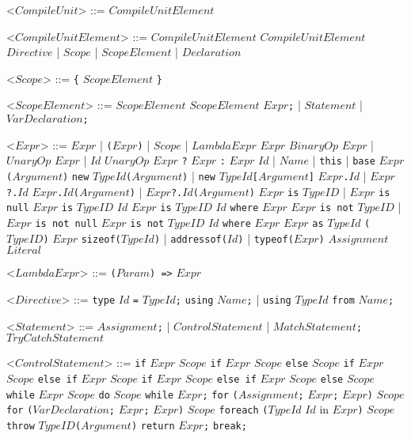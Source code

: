 \documentclass{article}
\newcommand{\gtext}[1]{<$#1$>}
\newcommand{\glit}[1]{\texttt{#1}}
\begin{document}
\begin{grammar}

	\gtext{CompileUnit} ::= $CompileUnitElement$

	\gtext{CompileUnitElement} ::= $CompileUnitElement$ $CompileUnitElement$
	\alt $Directive$ | $Scope$ | $ScopeElement$ | $Declaration$

	\gtext{Scope} ::= \glit{\{} $ScopeElement$ \glit{\}}
	
	\gtext{ScopeElement} ::= $ScopeElement$ $ScopeElement$
	\alt $Expr$\glit{;} | $Statement$	| $VarDeclaration$\glit{;}
	
	\gtext{Expr} ::= $Expr$ | \glit{(}$Expr$\glit{)} | $Scope$ | $LambdaExpr$
	\alt $Expr$ $BinaryOp$ $Expr$ | $UnaryOp$ $Expr$ | $Id$ $UnaryOp$
	\alt $Expr$ \glit{?} $Expr$ \glit{:} $Expr$
	\alt $Id$ | $Name$ | \glit{this} | \glit{base}
	\alt $Expr$\glit{(}$Argument$\glit{)}
	\alt \glit{new} $TypeId$\glit{(}$Argument$\glit{)} | \glit{new} $TypeId$\glit{[}$Argument$\glit{]}
	\alt $Expr$\glit{.}$Id$ | $Expr$\glit{?.}$Id$ 
	\alt $Expr$\glit{.}$Id$\glit{(}$Argument$\glit{)} | $Expr$\glit{?.}$Id$\glit{(}$Argument$\glit{)}
	\alt $Expr$ \glit{is} $TypeID$ | $Expr$ \glit{is null} $Expr$ \glit{is} $TypeID$ $Id$
	\alt $Expr$ \glit{is} $TypeID$ $Id$ \glit{where} $Expr$
	\alt $Expr$ \glit{is not} $TypeID$ | $Expr$ \glit{is not null}
	\alt $Expr$ \glit{is not} $TypeID$ $Id$ \glit{where} $Expr$ %
	\alt $Expr$ \glit{as} $TypeId$
	\alt \glit{(}$TypeID$\glit{)} $Expr$
	\alt \glit{sizeof($TypeId$}\glit{)} | \glit{addressof($Id$}\glit{)} | \glit{typeof($Expr$}\glit{)}
	\alt $Assignment$
	\alt $Literal$
	
	\gtext{LambdaExpr} ::= \glit{(}$Param$\glit{) =>} $Expr$
	
	\gtext{Directive} ::= \glit{type} $Id$ \glit{=} $TypeId$\glit{;}
	\alt \glit{using} $Name$\glit{;} | \glit{using} $TypeId$ \glit{from} $Name$\glit{;}

	\gtext{Statement} ::= $Assignment$\glit{;} | $ControlStatement$ | $MatchStatement$\glit{;}
	\alt $TryCatchStatement$
	
	\gtext{ControlStatement} ::= \glit{if} $Expr$ $Scope$
	\alt \glit{if} $Expr$ $Scope$ \glit{else} $Scope$
	\alt \glit{if} $Expr$ $Scope$ \glit{else if} $Expr$ $Scope$
	\alt \glit{if} $Expr$ $Scope$ \glit{else if} $Expr$ $Scope$ \glit{else} $Scope$
	\alt \glit{while} $Expr$ $Scope$
	\alt \glit{do} $Scope$ \glit{while} $Expr$\glit{;}
	\alt \glit{for} \glit{(}$Assignment$\glit{;} $Expr$\glit{;} $Expr$\glit{)} $Scope$
	\alt \glit{for} \glit{(}$VarDeclaration$\glit{;} $Expr$\glit{;} $Expr$\glit{)} $Scope$
	\alt \glit{foreach} \glit{(}$TypeId$ $Id$ {in} $Expr$\glit{)} $Scope$
	\alt \glit{throw} $TypeID$\glit{(}$Argument$\glit{)}
	\alt \glit{return} $Expr$\glit{;}
	\alt \glit{break;}
	

\end{grammar}
\end{document}
